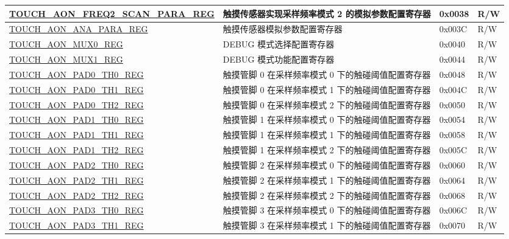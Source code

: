\begin{longtable}{ | p{8cm} | p{10cm} | p{1.3cm} | p{1cm} | }
\hyperref[regdesc:TOUCHAONFREQ2SCANPARAREG]{TOUCH\_AON\_FREQ2\_SCAN\_PARA\_REG} & 触摸传感器实现采样频率模式 2 的模拟参数配置寄存器 & 0x0038 & R/W \\ \hline
\hyperref[regdesc:TOUCHAONANAPARAREG]{TOUCH\_AON\_ANA\_PARA\_REG} & 触摸传感器模拟参数配置寄存器 & 0x003C & R/W \\ \hline
\hyperref[regdesc:TOUCHAONMUX0REG]{TOUCH\_AON\_MUX0\_REG} & DEBUG 模式选择配置寄存器 & 0x0040 & R/W \\ \hline
\hyperref[regdesc:TOUCHAONMUX1REG]{TOUCH\_AON\_MUX1\_REG} & DEBUG 模式功能配置寄存器 & 0x0044 & R/W \\ \hline
\hyperref[regdesc:TOUCHAONPADNTH0REG]{TOUCH\_AON\_PAD0\_TH0\_REG} & 触摸管脚 0 在采样频率模式 0 下的触碰阈值配置寄存器 & 0x0048 & R/W \\ \hline
\hyperref[regdesc:TOUCHAONPADNTH1REG]{TOUCH\_AON\_PAD0\_TH1\_REG} & 触摸管脚 0 在采样频率模式 1 下的触碰阈值配置寄存器 & 0x004C & R/W \\ \hline
\hyperref[regdesc:TOUCHAONPADNTH2REG]{TOUCH\_AON\_PAD0\_TH2\_REG} & 触摸管脚 0 在采样频率模式 2 下的触碰阈值配置寄存器 & 0x0050 & R/W \\ \hline
\hyperref[regdesc:TOUCHAONPADNTH0REG]{TOUCH\_AON\_PAD1\_TH0\_REG} & 触摸管脚 1 在采样频率模式 0 下的触碰阈值配置寄存器 & 0x0054 & R/W \\ \hline
\hyperref[regdesc:TOUCHAONPADNTH1REG]{TOUCH\_AON\_PAD1\_TH1\_REG} & 触摸管脚 1 在采样频率模式 1 下的触碰阈值配置寄存器 & 0x0058 & R/W \\ \hline
\hyperref[regdesc:TOUCHAONPADNTH2REG]{TOUCH\_AON\_PAD1\_TH2\_REG} & 触摸管脚 1 在采样频率模式 2 下的触碰阈值配置寄存器 & 0x005C & R/W \\ \hline
\hyperref[regdesc:TOUCHAONPADNTH0REG]{TOUCH\_AON\_PAD2\_TH0\_REG} & 触摸管脚 2 在采样频率模式 0 下的触碰阈值配置寄存器 & 0x0060 & R/W \\ \hline
\hyperref[regdesc:TOUCHAONPADNTH1REG]{TOUCH\_AON\_PAD2\_TH1\_REG} & 触摸管脚 2 在采样频率模式 1 下的触碰阈值配置寄存器 & 0x0064 & R/W \\ \hline
\hyperref[regdesc:TOUCHAONPADNTH2REG]{TOUCH\_AON\_PAD2\_TH2\_REG} & 触摸管脚 2 在采样频率模式 2 下的触碰阈值配置寄存器 & 0x0068 & R/W \\ \hline
\hyperref[regdesc:TOUCHAONPADNTH0REG]{TOUCH\_AON\_PAD3\_TH0\_REG} & 触摸管脚 3 在采样频率模式 0 下的触碰阈值配置寄存器 & 0x006C & R/W \\ \hline
\hyperref[regdesc:TOUCHAONPADNTH1REG]{TOUCH\_AON\_PAD3\_TH1\_REG} & 触摸管脚 3 在采样频率模式 1 下的触碰阈值配置寄存器 & 0x0070 & R/W \\ \hline

\end{longtable}
